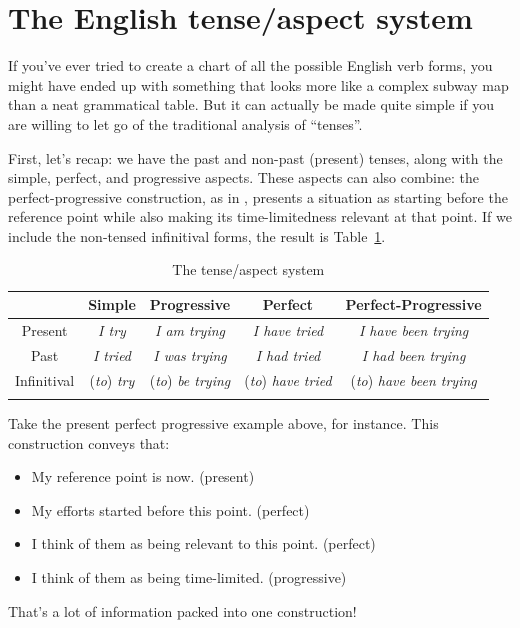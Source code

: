 \section{The English tense/aspect system}\label{sec:tense-aspect}

If you've ever tried to create a chart of all the possible English verb forms, you might have ended up with something that looks more like a complex subway map than a neat grammatical table. But it can actually be made quite simple if you are willing to let go of the traditional analysis of \enquote{tenses}.

First, let's recap: we have the past and non-past (present) tenses, along with the simple, perfect, and progressive aspects. These aspects can also combine: the perfect-progressive construction, as in , presents a situation as starting before the reference point while also making its time-limitedness relevant at that point. If we include the non-tensed infinitival forms, the result is Table~\ref{tab:tense-aspect}.

\begin{table}
    \begin{tabular}{ccccc}
        \lsptoprule
        & Simple & Progressive & Perfect & Perfect-Progressive \\
        \midrule
        Present &
        \textit{I try} & 
        \textit{I am trying} & 
        \textit{I have tried} & 
        \textit{I have been trying} \\
        Past &
        \textit{I tried} &
        \textit{I was trying} & 
        \textit{I had tried} & 
        \textit{I had been trying} \\
        Infinitival &
        (\textit{to})\textit{ try} &
        (\textit{to})\textit{ be trying} &
        (\textit{to})\textit{ have tried} &
        (\textit{to})\textit{ have been trying} \\
        \lspbottomrule
    \end{tabular}
    \caption{The tense/aspect system}
    \label{tab:tense-aspect}
\end{table}

Take the present perfect progressive example above, for instance. This construction conveys that:

\begin{itemize}[nosep]
    \item My reference point is now. \hfill(present)
    \item My efforts started before this point. \hfill(perfect)
    \item I think of them as being relevant to this point. \hfill(perfect)
    \item I think of them as being time-limited. \hfill(progressive)
\end{itemize}
That's a lot of information packed into one construction! 

